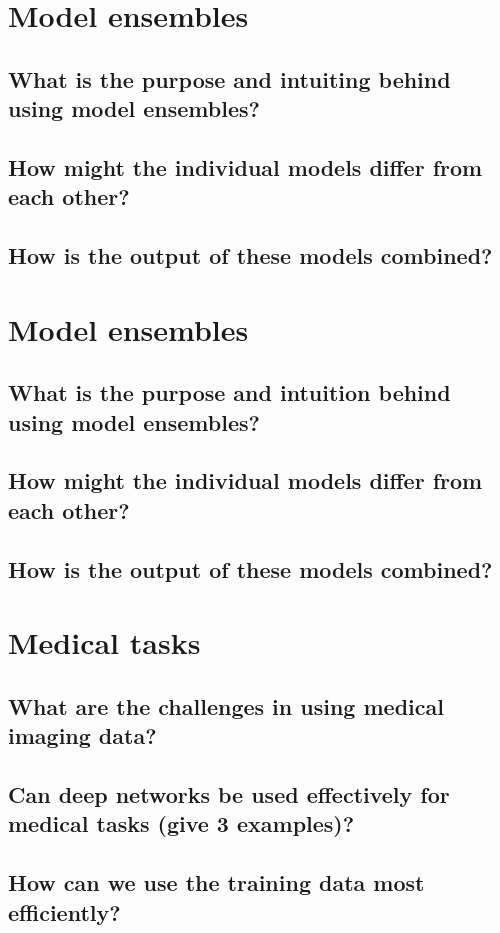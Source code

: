 \section{Model ensembles}
\subsection{What is the purpose and intuiting behind using model ensembles?}
\subsection{How might the individual models differ from each other?}
\subsection{How is the output of these models combined?}

\section{Model ensembles}
\subsection{What is the purpose and intuition behind using model ensembles?}
\subsection{How might the individual models differ from each other?}
\subsection{How is the output of these models combined?}

\section{Medical tasks}
\subsection{What are the challenges in using medical imaging data?}
\subsection{Can deep networks be used effectively for medical tasks (give 3 examples)?}
\subsection{How can we use the training data most efficiently?}

